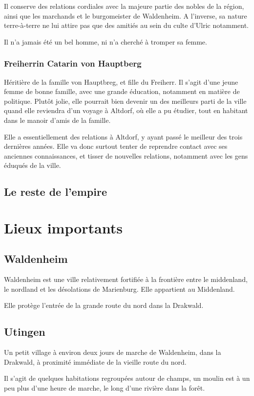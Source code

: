 \documentclass[10pt,a4paper]{book}
\begin{document}
Il conserve des relations cordiales avec la majeure partie des nobles de la région, ainsi que les marchands et le burgomeister de Waldenheim. A l'inverse, sa nature terre-à-terre ne lui attire pas que des amitiés au sein du culte d'Ulric notamment.

Il n'a jamais été un bel homme, ni n'a cherché à tromper sa femme.

\subsection{Freiherrin Catarin von Hauptberg}
Héritière de la famille von Hauptbreg, et fille du Freiherr. Il s'agit d'une jeune femme de bonne famille, avec une grande éducation, notamment en matière de politique. Plutôt jolie, elle pourrait bien devenir un des meilleurs parti de la ville quand elle reviendra d'un voyage à Altdorf, où elle a pu étudier, tout en habitant dans le manoir d'amis de la famille.

Elle a essentiellement des relations à Altdorf, y ayant passé le meilleur des trois dernières années. Elle va donc surtout tenter de reprendre contact avec ses anciennes connaissances, et tisser de nouvelles relations, notamment avec les gens éduqués de la ville.
\section{Le reste de l'empire}

\chapter{Lieux importants}
\section{Waldenheim}
Waldenheim est une ville relativement fortifiée à la frontière entre le middenland, le nordland et les désolations de Marienburg. Elle appartient au Middenland.

Elle protège l'entrée de la grande route du nord dans la Drakwald.
\section{Utingen}
Un petit village à environ deux jours de marche de Waldenheim, dans la Drakwald, à proximité immédiate de la vieille route du nord. 

Il s'agit de quelques habitations regroupées autour de champs, un moulin est à un peu plus d'une heure de marche, le long d'une rivière dans la forêt. 
\end{document}

